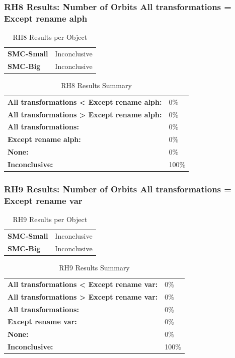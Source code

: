 \documentclass{article}\usepackage[]{graphicx}\usepackage[]{color}
\begin{document}
	
	

	
	\subsubsection{RH8 Results: Number of Orbits All transformations = Except rename alph}
	
	
	\begin{table}[H]
	\centering
	\caption{RH8 Results per Object}
	\begin{tabular}{ll}
	\textbf{SMC-Small} & Inconclusive \\
	\textbf{SMC-Big} & Inconclusive \\
	\end{tabular}
	\end{table}

	\begin{table}[H]
	\centering
	\caption{RH8 Results Summary}
	\begin{tabular}{ll}
	\textbf{All transformations \textless{} Except rename alph:}& 0\% \\
	\textbf{All transformations \textgreater{} Except rename alph:}& 0\%\\
	\textbf{All transformations:} & 0\%\\
	\textbf{Except rename alph:} & 0\%\\
	\textbf{None:}& 0\%\\
	\textbf{Inconclusive:}& 100\%
			
	
	\end{tabular}
	\end{table}
	
	
	

	
	\subsubsection{RH9 Results: Number of Orbits All transformations = Except rename var}
	
	
	\begin{table}[H]
	\centering
	\caption{RH9 Results per Object}
	\begin{tabular}{ll}
	\textbf{SMC-Small} & Inconclusive \\
	\textbf{SMC-Big} & Inconclusive \\
	\end{tabular}
	\end{table}

	\begin{table}[H]
	\centering
	\caption{RH9 Results Summary}
	\begin{tabular}{ll}
	\textbf{All transformations \textless{} Except rename var:}& 0\% \\
	\textbf{All transformations \textgreater{} Except rename var:}& 0\%\\
	\textbf{All transformations:} & 0\%\\
	\textbf{Except rename var:} & 0\%\\
	\textbf{None:}& 0\%\\
	\textbf{Inconclusive:}& 100\%
			
	
	\end{tabular}
	\end{table}
	
\end{document}
